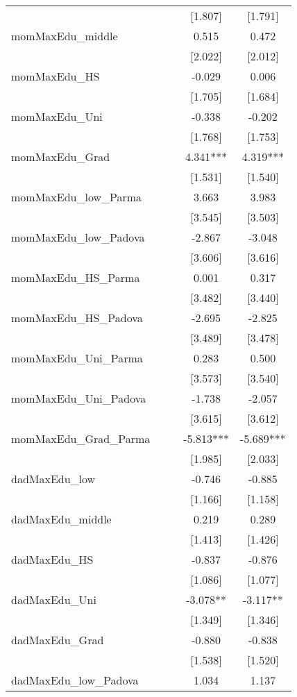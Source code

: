 \documentclass[]{article}
\begin{document}
\begin{tabular}{lcccc}
 &  &  & [1.807] & [1.791] \\
momMaxEdu\_middle &  &  & 0.515 & 0.472 \\
 &  &  & [2.022] & [2.012] \\
momMaxEdu\_HS &  &  & -0.029 & 0.006 \\
 &  &  & [1.705] & [1.684] \\
momMaxEdu\_Uni &  &  & -0.338 & -0.202 \\
 &  &  & [1.768] & [1.753] \\
momMaxEdu\_Grad &  &  & 4.341*** & 4.319*** \\
 &  &  & [1.531] & [1.540] \\
momMaxEdu\_low\_Parma &  &  & 3.663 & 3.983 \\
 &  &  & [3.545] & [3.503] \\
momMaxEdu\_low\_Padova &  &  & -2.867 & -3.048 \\
 &  &  & [3.606] & [3.616] \\
momMaxEdu\_HS\_Parma &  &  & 0.001 & 0.317 \\
 &  &  & [3.482] & [3.440] \\
momMaxEdu\_HS\_Padova &  &  & -2.695 & -2.825 \\
 &  &  & [3.489] & [3.478] \\
momMaxEdu\_Uni\_Parma &  &  & 0.283 & 0.500 \\
 &  &  & [3.573] & [3.540] \\
momMaxEdu\_Uni\_Padova &  &  & -1.738 & -2.057 \\
 &  &  & [3.615] & [3.612] \\
momMaxEdu\_Grad\_Parma &  &  & -5.813*** & -5.689*** \\
 &  &  & [1.985] & [2.033] \\
dadMaxEdu\_low &  &  & -0.746 & -0.885 \\
 &  &  & [1.166] & [1.158] \\
dadMaxEdu\_middle &  &  & 0.219 & 0.289 \\
 &  &  & [1.413] & [1.426] \\
dadMaxEdu\_HS &  &  & -0.837 & -0.876 \\
 &  &  & [1.086] & [1.077] \\
dadMaxEdu\_Uni &  &  & -3.078** & -3.117** \\
 &  &  & [1.349] & [1.346] \\
dadMaxEdu\_Grad &  &  & -0.880 & -0.838 \\
 &  &  & [1.538] & [1.520] \\
dadMaxEdu\_low\_Padova &  &  & 1.034 & 1.137 \\

\end{tabular}
\end{document}
